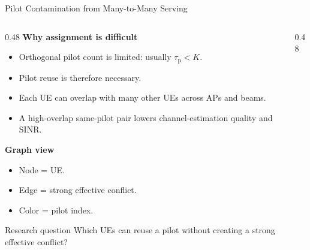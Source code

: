 \documentclass[10pt,aspectratio=169]{beamer}
\newcommand{\taup}{\tau_{\mathrm{p}}}
\newenvironment{tightitemize}{%
    \begin{itemize}
        \setlength{\itemsep}{1pt}
        \setlength{\parskip}{0pt}
        \setlength{\parsep}{0pt}
}{%
    \end{itemize}
}
\begin{document}
\begin{frame}{Pilot Contamination from Many-to-Many Serving}
    \footnotesize
    \begin{columns}[T,onlytextwidth]
        \begin{column}{0.48\textwidth}
            \textbf{Why assignment is difficult}
            \begin{tightitemize}
                \item Orthogonal pilot count is limited: usually $\taup<K$.
                \item Pilot reuse is therefore necessary.
                \item Each UE can overlap with many other UEs across APs and beams.
                \item A high-overlap same-pilot pair lowers channel-estimation quality and SINR.
            \end{tightitemize}

            \vspace{0.35em}
            \textbf{Graph view}
            \begin{tightitemize}
                \item Node = UE.
                \item Edge = strong effective conflict.
                \item Color = pilot index.
            \end{tightitemize}

            \vspace{0.2em}
            \begin{block}{Research question}
                Which UEs can reuse a pilot without creating a strong effective conflict?
            \end{block}
        \end{column}
        \begin{column}{0.48\textwidth}
            \centering
\end{column}
\end{columns}
\end{frame}
\end{document}
